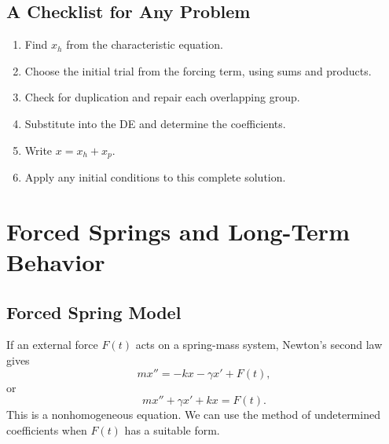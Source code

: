 \documentclass[10pt,letterpaper]{article}
\begin{document}
\subsection{A Checklist for Any Problem}
\begin{enumerate}
\item Find $x_h$ from the characteristic equation.
\item Choose the initial trial from the forcing term, using sums and products.
\item Check for duplication and repair each overlapping group.
\item Substitute into the DE and determine the coefficients.
\item Write $x=x_h+x_p$.
\item Apply any initial conditions to this complete solution.
\end{enumerate}

\section{Forced Springs and Long-Term Behavior}

\subsection{Forced Spring Model}

If an external force $F(t)$ acts on a spring-mass system,
Newton's second law gives
\[
mx''=-kx-\gamma x'+F(t),
\]
or
\[
\boxed{mx''+\gamma x'+kx=F(t).}
\]
This is a nonhomogeneous equation. We can use the method
of undetermined coefficients when $F(t)$ has a suitable form.
\end{document}

